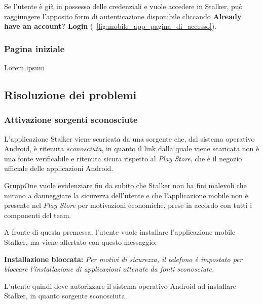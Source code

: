 \documentclass[../manuale-utente.tex]{subfiles}
\begin{document}
Se l'utente è già in possesso delle credenziali e vuole accedere in Stalker, può raggiungere l'apposito form di autenticazione disponibile cliccando \textbf{Already have an account? Login} (~\ref{fig:mobile_app_pagina_di_accesso}).
\newpage

\subsubsection{Pagina iniziale}%
\label{subs:pagina_iniziale}


Lorem ipsum
\newpage


\subsection{Risoluzione dei problemi}%
\label{subs:mobile_app_risoluzione_problemi}

\subsubsection{Attivazione sorgenti sconosciute}%
\label{subs:mobile_app_attivare_sorgenti_sconosciute}

L'applicazione Stalker viene scaricata da una sorgente che, dal sistema operativo Android, è ritenuta \textit{sconosciuta}, in quanto il link dalla quale viene scaricata non è una fonte verificabile e ritenuta sicura rispetto al \textit{Play Store}, che è il negozio ufficiale delle applicazioni Android.

GruppOne vuole evidenziare fin da subito che Stalker non ha fini malevoli che mirano a danneggiare la sicurezza dell'utente e che l'applicazione mobile non è presente nel \textit{Play Store} per motivazioni economiche, prese in accordo con tutti i componenti del team.

A fronte di questa premessa, l'utente vuole installare l'applicazione mobile Stalker, ma viene allertato con questo messaggio:

\textbf{Installazione bloccata:} \textit{Per motivi di sicurezza, il telefono è impostato per bloccare l’installazione di applicazioni ottenute da fonti sconosciute.}

L'utente quindi deve autorizzare il sistema operativo Android ad installare Stalker, in quanto sorgente sconosciuta.
\end{document}
